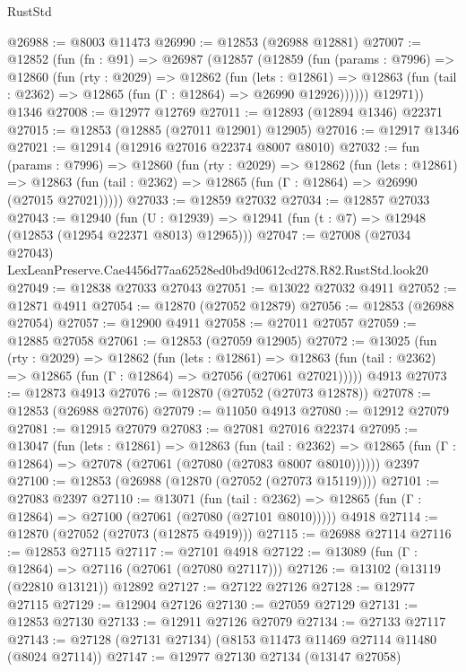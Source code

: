 \begin{lexlean}{RustStd}
\begin{coremodule}
@26988 := @8003 @11473
@26990 := @12853 (@26988 @12881)
@27007 := @12852
    (fun (fn : @91) =>
    @26987
      (@12857
        (@12859
          (fun (params : @7996) =>
          @12860
            (fun (rty : @2029) =>
            @12862
              (fun (lets : @12861) =>
              @12863 (fun (tail : @2362) => @12865 (fun (Γ : @12864) => @26990 @12926))))))
        @12971))
    @1346
@27008 := @12977 @12769
@27011 := @12893 (@12894 @1346) @22371
@27015 := @12853 (@12885 (@27011 @12901) @12905)
@27016 := @12917 @1346
@27021 := @12914 (@12916 @27016 @22374 @8007 @8010)
@27032 := fun (params : @7996) =>
  @12860
    (fun (rty : @2029) =>
    @12862
      (fun (lets : @12861) =>
      @12863 (fun (tail : @2362) => @12865 (fun (Γ : @12864) => @26990 (@27015 @27021)))))
@27033 := @12859 @27032
@27034 := @12857 @27033
@27043 := @12940
    (fun (U : @12939) => @12941 (fun (t : @7) => @12948 (@12853 (@12954 @22371 @8013) @12965)))
@27047 := @27008
    (@27034 @27043)
    LexLeanPreserve.Cae4456d77aa62528ed0bd9d0612cd278.R82.RustStd.look20
@27049 := @12838 @27033 @27043
@27051 := @13022 @27032 @4911
@27052 := @12871 @4911
@27054 := @12870 (@27052 @12879)
@27056 := @12853 (@26988 @27054)
@27057 := @12900 @4911
@27058 := @27011 @27057
@27059 := @12885 @27058
@27061 := @12853 (@27059 @12905)
@27072 := @13025
    (fun (rty : @2029) =>
    @12862
      (fun (lets : @12861) =>
      @12863 (fun (tail : @2362) => @12865 (fun (Γ : @12864) => @27056 (@27061 @27021)))))
    @4913
@27073 := @12873 @4913
@27076 := @12870 (@27052 (@27073 @12878))
@27078 := @12853 (@26988 @27076)
@27079 := @11050 @4913
@27080 := @12912 @27079
@27081 := @12915 @27079
@27083 := @27081 @27016 @22374
@27095 := @13047
    (fun (lets : @12861) =>
    @12863
      (fun (tail : @2362) =>
      @12865 (fun (Γ : @12864) => @27078 (@27061 (@27080 (@27083 @8007 @8010))))))
    @2397
@27100 := @12853 (@26988 (@12870 (@27052 (@27073 @15119))))
@27101 := @27083 @2397
@27110 := @13071
    (fun (tail : @2362) => @12865 (fun (Γ : @12864) => @27100 (@27061 (@27080 (@27101 @8010)))))
    @4918
@27114 := @12870 (@27052 (@27073 (@12875 @4919)))
@27115 := @26988 @27114
@27116 := @12853 @27115
@27117 := @27101 @4918
@27122 := @13089 (fun (Γ : @12864) => @27116 (@27061 (@27080 @27117)))
@27126 := @13102 (@13119 (@22810 @13121)) @12892
@27127 := @27122 @27126
@27128 := @12977 @27115
@27129 := @12904 @27126
@27130 := @27059 @27129
@27131 := @12853 @27130
@27133 := @12911 @27126 @27079
@27134 := @27133 @27117
@27143 := @27128 (@27131 @27134) (@8153 @11473 @11469 @27114 @11480 (@8024 @27114))
@27147 := @12977 @27130 @27134 (@13147 @27058)

\end{coremodule}
\end{lexlean}
